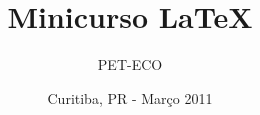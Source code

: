 \documentclass[a4paper,12pt]{article}
\title{Minicurso \LaTeX}
\author{PET-ECO}
\institute{Universidade Teconlógica Federal do Paraná}
\date{Curitiba, PR - Março 2011}
\begin{document}
\begin{frame}
	\titlepage
\end{frame}





\end{document}
